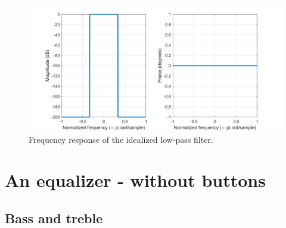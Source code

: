 \documentclass[journal]{IEEEtran}
\begin{document}
\begin{figure}
    \centering
    \includegraphics[width=\columnwidth]{assignment_02/plots/freq_resp_lowpass_fir.png}
    \caption{Frequency response of the idealized low-pass filter.}
    \label{fig:freq_resp_lowpass}
\end{figure}
\section{An equalizer - without buttons}

\subsection{Bass and treble}
\end{document}
